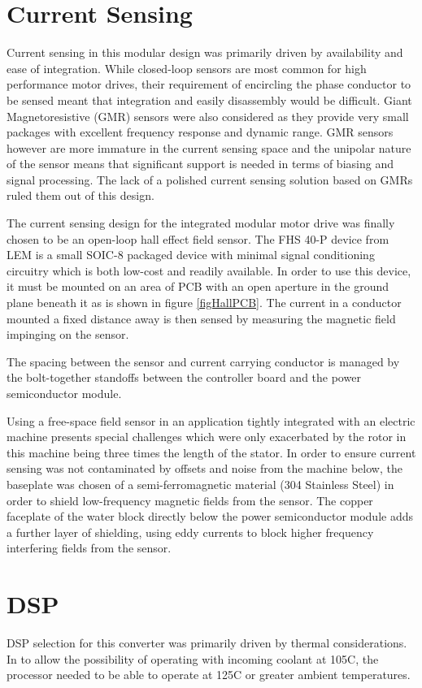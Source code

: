 \section{Current Sensing}
Current sensing in this modular design was primarily driven by availability
and ease of integration.
While closed-loop sensors are most common for high performance motor drives,
their requirement of encircling the phase conductor to be sensed meant that
integration and easily disassembly would be difficult.
Giant Magnetoresistive (GMR) sensors were also considered as they provide very
small packages with excellent frequency response and dynamic range.
GMR sensors however are more immature in the current sensing space and the
unipolar nature of the sensor means that significant support is needed in
terms of biasing and signal processing.
The lack of a polished current sensing solution based on GMRs ruled them out
of this design.

The current sensing design for the integrated modular motor drive was finally
chosen to be an open-loop hall effect field sensor.
The FHS 40-P device from LEM is a small SOIC-8 packaged device with minimal
signal conditioning circuitry which is both low-cost and readily available.
In order to use this device, it must be mounted on an area of PCB with an open
aperture in the ground plane beneath it as is shown in figure
\ref{figHallPCB}.
The current in a conductor mounted a fixed distance away is then sensed by
measuring the magnetic field impinging on the sensor.

The spacing between the sensor and current carrying conductor is managed by
the bolt-together standoffs between the controller board and the power
semiconductor module.

Using a free-space field sensor in an application tightly integrated with an
electric machine presents special challenges which were only exacerbated by
the rotor in this machine being three times the length of the stator.
In order to ensure current sensing was not contaminated by offsets and noise
from the machine below, the baseplate was chosen of a semi-ferromagnetic
material (304 Stainless Steel) in order to shield low-frequency magnetic
fields from the sensor.
The copper faceplate of the water block directly below the power semiconductor
module adds a further layer of shielding, using eddy currents to block higher
frequency interfering fields from the sensor.

\section{DSP}
DSP selection for this converter was primarily driven by thermal
considerations. In to allow the possibility of operating with incoming coolant
at 105C, the processor needed to be able to operate at 125C or greater ambient
temperatures.

